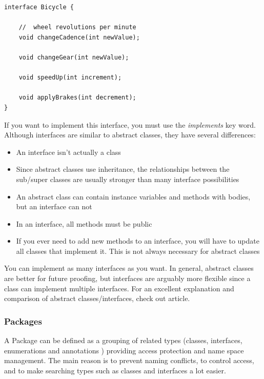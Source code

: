 \documentclass{article}
\begin{document}
\begin{lstlisting}
interface Bicycle {

    //  wheel revolutions per minute
    void changeCadence(int newValue);

    void changeGear(int newValue);

    void speedUp(int increment);

    void applyBrakes(int decrement);
}
\end{lstlisting}

If you want to implement this interface, you must use the \emph{implements} key word. Although interfaces are similar to abstract classes, they have several differences: 

\begin{itemize}
\item An interface isn't actually a class 
\item Since abstract classes use inheritance, the relationships between the sub/super classes are usually stronger than many interface possibilities
\item An abstract class can contain instance variables and methods with bodies, but an interface can not
\item In an interface, all methods must be public
\item If you ever need to add new methods to an interface, you will have to update all classes that implement it. This is not always necessary for abstract classes
\end{itemize}

You can implement as many interfaces as you want. In general, abstract classes are better for future proofing, but interfaces are arguably more flexible since a class can implement multiple interfaces. For an excellent explanation and comparison of abstract classes/interfaces, check out \href{http://www.programmerinterview.com/index.php/java-questions/interface-vs-abstract-class/}{\color{blue}{this}} article.
\newpage

\subsubsection{Packages}
A Package can be defined as a grouping of related types (classes, interfaces, enumerations and annotations ) providing access protection and name space management. The main reason is to prevent naming conflicts, to control access, and to make searching types such as classes and interfaces a lot easier.
\end{document}

